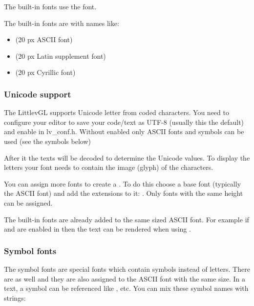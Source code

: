 \documentclass[letterpaper,10pt,english]{sphinxmanual}
\begin{document}
The built-in fonts use the  font.

The built-in fonts are  with names like:
\begin{itemize}
\item {} 
 (20 px ASCII font)

\item {} 
 (20 px Latin supplement font)

\item {} 
 (20 px Cyrillic font)

\end{itemize}


\subsubsection{Unicode support}
\label{\detokenize{overview/fonts:unicode-support}}
The LittlevGL supports Unicode letter from  coded characters. You need to configure your editor to save your code/text as UTF-8 (usually this the default) and enable  in lv\_conf.h. Without enabled  only ASCII fonts and symbols can be used (see the symbols below)

After it the texts will be decoded to determine the Unicode values. To display the letters your font needs to contain the image (glyph) of the characters.

You can assign more fonts to create a . To do this choose a base font (typically the ASCII font) and add the extensions to it: . Only fonts with the same height can be assigned.

The built-in fonts are already added to the same sized ASCII font. For example if  and  are enabled in  then the  text can be rendered when using .


\subsubsection{Symbol fonts}
\label{\detokenize{overview/fonts:symbol-fonts}}
The symbol fonts are special fonts which contain symbols instead of letters. There are  as well and they are also assigned to the ASCII font with the same size. In a text, a symbol can be referenced like ,  etc. You can mix these symbol names with strings:
\end{document}
